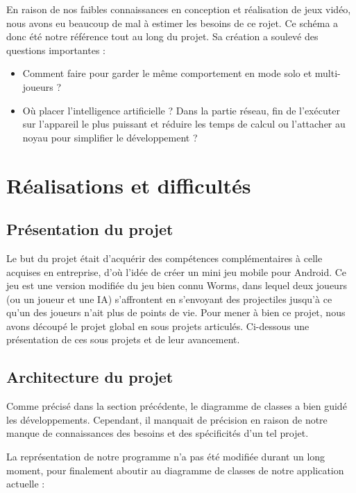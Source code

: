 \documentclass{report}
\begin{document}
En raison de nos faibles connaissances en conception et réalisation de
jeux vidéo, nous avons eu beaucoup de mal à estimer les besoins de ce
rojet. Ce schéma a donc été notre référence tout au long du projet. Sa
création a soulevé des questions importantes :

\begin{itemize}
\item Comment faire pour garder le même comportement en mode solo et
multi-joueurs ?
\item Où placer l’intelligence artificielle ? Dans la partie réseau,
fin de l’exécuter sur l’appareil le plus puissant et réduire les temps
de calcul ou l’attacher au noyau pour simplifier le développement ?
\end{itemize}

\newpage

\section{Réalisations et difficultés}
\bigskip


\subsection{Présentation du projet}
\bigskip


Le but du projet était d'acquérir des compétences complémentaires à
celle acquises en entreprise, d’où l’idée de créer un mini jeu mobile
pour Android. Ce jeu est une version modifiée du jeu bien connu Worms,
dans lequel deux joueurs (ou un joueur et une IA) s’affrontent en
s’envoyant des projectiles jusqu’à ce qu’un des joueurs n’ait plus de
points de vie.
Pour mener à bien ce projet, nous avons découpé le projet global en
sous projets articulés. Ci-dessous une présentation de ces sous projets
et de leur avancement.

\subsection{Architecture du projet}
\bigskip


Comme précisé dans la section précédente, le diagramme de classes a bien
guidé les développements. Cependant, il manquait de précision en raison
de notre manque de connaissances des besoins et des spécificités d’un
tel projet.

La représentation de notre programme n’a pas été modifiée durant un
long moment, pour finalement aboutir au diagramme de classes de notre
application actuelle :
\end{document}
